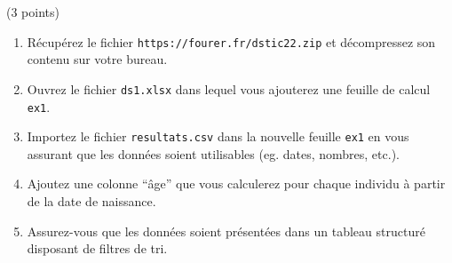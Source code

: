 \documentclass[a4paper]{article}
\begin{document}
\exost (3 points)
%
\begin{enumerate}
 \item R\'ecup\'erez le fichier \verb?https://fourer.fr/dstic22.zip? et d\'ecompressez son contenu sur votre bureau. %
 \item Ouvrez le fichier \verb?ds1.xlsx? dans lequel vous ajouterez une feuille de calcul \verb?ex1?.
 \item Importez le fichier \verb?resultats.csv? dans la nouvelle feuille \verb?ex1? en vous assurant que les donn\'ees soient utilisables (eg. dates, nombres, etc.).  %
 \item Ajoutez une colonne ``\^age'' que vous calculerez pour chaque individu \`a partir de la date de naissance. %
 \item Assurez-vous que les donn\'ees soient pr\'esent\'ees dans un tableau structur\'e disposant de filtres de tri.
\end{enumerate}
\end{document}
